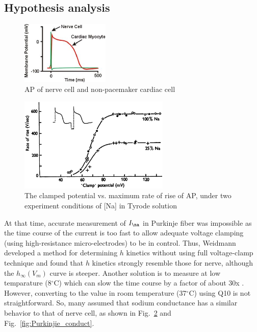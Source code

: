 
\subsection{Hypothesis analysis}
\label{sec:quant-analys-1}

\begin{figure}[hbt]
  \centerline{\includegraphics[height=3cm,
    angle=0]{./images/action_potentials_compare.eps}}
\caption{AP of nerve cell and non-pacemaker cardiac cell}
\label{fig:AP_compare}
\end{figure}

\begin{figure}[!hbt]
  \centerline{\includegraphics[height=4.5cm]{./images/clamped_potential_Na.eps}}
  \caption{The clamped potential vs. maximum rate of rise of AP, under
    two experiment conditions of [Na] in Tyrode solution}
  \label{fig:clamped_potential}
\end{figure}

\begin{framed}

At that time, accurate measurement of $I_\na$ in Purkinje fiber was impossible
as the time course of the current is too fast to allow adequate voltage clamping
(using high-resistance micro-electrodes) to be in control. Thus, Weidmann
\citep{weidmann1955cmp} developed a method for determining $h$ kinetics without
using full voltage-clamp technique and found that $h$ kinetics strongly resemble
those for nerve, although the $h_\infty(V_m)$ curve is steeper. Another solution
is to measure at low temparature (8$^\circ$C) which can slow the time course by
a factor of about 30x \citep{dudel1970}. However, converting to the value in 
room temperature (37$^\circ$C) using Q10 is not straightforward. So, many
assumed that sodium conductance has a similar behavior to that of nerve cell, as
shown in Fig.~\ref{fig:clamped_potential} and Fig.~\ref{fig:Purkinjie_conduct}.
\end{framed}

